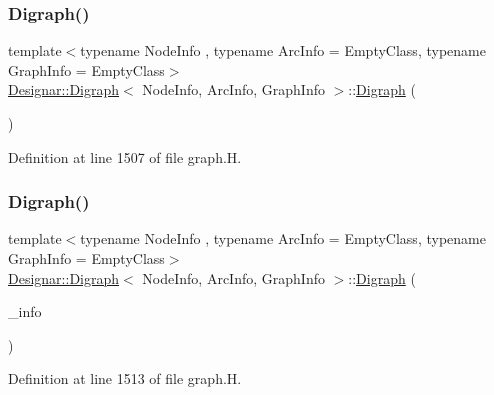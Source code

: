 \subsubsection{\texorpdfstring{Digraph()}{Digraph()}\hspace{0.1cm}{\footnotesize\ttfamily [1/5]}}
{\footnotesize\ttfamily template$<$typename Node\+Info , typename Arc\+Info  = Empty\+Class, typename Graph\+Info  = Empty\+Class$>$ \\
\hyperlink{class_designar_1_1_digraph}{Designar\+::\+Digraph}$<$ Node\+Info, Arc\+Info, Graph\+Info $>$\+::\hyperlink{class_designar_1_1_digraph}{Digraph} (\begin{DoxyParamCaption}{ }\end{DoxyParamCaption})\hspace{0.3cm}{\ttfamily [inline]}}



Definition at line 1507 of file graph.\+H.

\mbox{\label{class_designar_1_1_digraph_ae5210934b3e6e64caceffee62ff1fcad}} 
\subsubsection{\texorpdfstring{Digraph()}{Digraph()}\hspace{0.1cm}{\footnotesize\ttfamily [2/5]}}
{\footnotesize\ttfamily template$<$typename Node\+Info , typename Arc\+Info  = Empty\+Class, typename Graph\+Info  = Empty\+Class$>$ \\
\hyperlink{class_designar_1_1_digraph}{Designar\+::\+Digraph}$<$ Node\+Info, Arc\+Info, Graph\+Info $>$\+::\hyperlink{class_designar_1_1_digraph}{Digraph} (\begin{DoxyParamCaption}\item[{const Graph\+Info \&}]{\+\_\+info }\end{DoxyParamCaption})\hspace{0.3cm}{\ttfamily [inline]}}



Definition at line 1513 of file graph.\+H.

\mbox{\label{class_designar_1_1_digraph_a534b12da4e0aeb32cff655f05e6c91a4}} 
